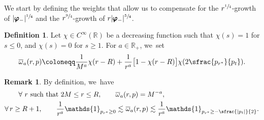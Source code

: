 \documentclass[JEP,XML,SOM,Unicode,published]{cedram}
\theoremstyle{plain}
\theoremstyle{definition}
\newtheorem{definition}[proposition]{Definition}
\newtheorem{remark}[proposition]{Remark}
\newcommand\R{{\mathbb{R}}}
\begin{document}
We start by defining the weights that allow us to compensate for the $r^{\sfrac{1}{4}}$-growth of $|\pmb{\varphi}_-|^{\sfrac{1}{4}}$ and the $r^{\sfrac{9}{4}}$-growth of $r|\pmb{\varphi}_-|^{\sfrac{5}{4}}$.

\begin{definition}\label{Defweight}
Let $\chi \in C^\infty (\R)$ be a decreasing function such that $\chi (s) =1$ for $s \leq 0$, and $\chi (s) =0$ for $s \geq 1$. For $a \in \R_+$, we~set
\[
\overline{\omega}_a(r,p) \coloneqq \frac{1}{M^a}\chi (r-R)+\frac{1}{r^a}\bigl[ 1-\chi(r-R) \bigr] \chi(2\sfrac{p_{r^*}}{p_t}).
\]
\end{definition}
\begin{remark}
By definition, we~have
\begin{align*}
\forall \text{ $r$ such that } 2M \leq r \leq R, \qquad \overline{\omega}_a &(r,p) =M^{-a},\\
\forall \, r \geq R+1, \qquad \frac{1}{r^a} \mathds{1}_{p_{r^*} \geq 0} \lesssim &\,\,\overline{\omega}_a(r,p) \lesssim \frac{1}{r^a} \mathds{1}_{p_{r^*} \geq -\sfrac{|p_t|}{2}}.
\end{align*}
\end{remark}
\end{document}
